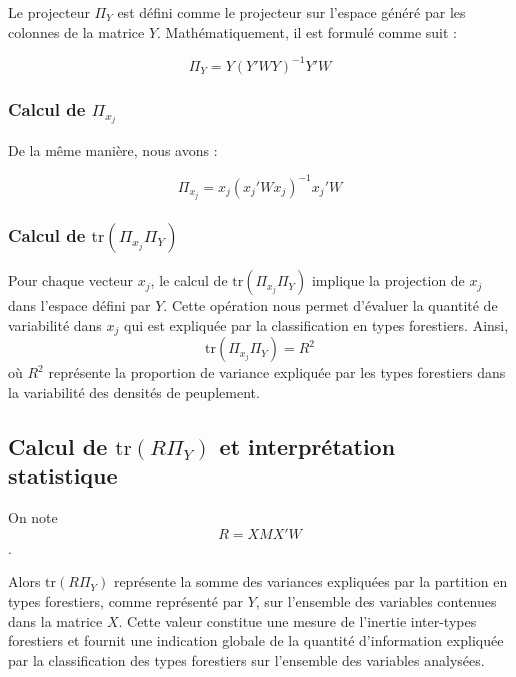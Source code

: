 \documentclass[
]{article}
\begin{document}
Le projecteur \(\Pi_Y\) est défini comme le projecteur sur l'espace
généré par les colonnes de la matrice \(Y\). Mathématiquement, il est
formulé comme suit :

\[
   \Pi_Y = Y \left( Y' W Y \right)^{-1} Y' W
   \]

\hypertarget{calcul-de-pi_x_j}{%
\subsubsection{\texorpdfstring{Calcul de
\(\Pi_{x_j}\)}{Calcul de \textbackslash Pi\_\{x\_j\}}}\label{calcul-de-pi_x_j}}

De la même manière, nous avons :

\[
   \Pi_{x_j} = {x_j} \left( {x_j}' W {x_j} \right)^{-1} {x_j}' W
   \]

\hypertarget{calcul-de-texttrpi_x_j-pi_y}{%
\subsubsection{\texorpdfstring{Calcul de
\(\text{tr}(\Pi_{x_j} \Pi_Y)\)}{Calcul de \textbackslash text\{tr\}(\textbackslash Pi\_\{x\_j\} \textbackslash Pi\_Y)}}\label{calcul-de-texttrpi_x_j-pi_y}}

Pour chaque vecteur \(x_j\), le calcul de \(\text{tr}(\Pi_{x_j} \Pi_Y)\)
implique la projection de \(x_j\) dans l'espace défini par \(Y\). Cette
opération nous permet d'évaluer la quantité de variabilité dans \(x_j\)
qui est expliquée par la classification en types forestiers.
Ainsi,\[ \text{tr}(\Pi_{x_j} \Pi_Y) = R^2 \] où \(R^2\) représente la
proportion de variance expliquée par les types forestiers dans la
variabilité des densités de peuplement.

\hypertarget{calcul-de-texttrr-pi_y-et-interpruxe9tation-statistique}{%
\subsection{\texorpdfstring{Calcul de \(\text{tr}(R \Pi_Y)\) et
interprétation
statistique}{Calcul de \textbackslash text\{tr\}(R \textbackslash Pi\_Y) et interprétation statistique}}\label{calcul-de-texttrr-pi_y-et-interpruxe9tation-statistique}}

On note \[ R = X M X' W \].

Alors \(\text{tr}(R \Pi_Y)\) représente la somme des variances
expliquées par la partition en types forestiers, comme représenté par
\(Y\), sur l'ensemble des variables contenues dans la matrice \(X\).
Cette valeur constitue une mesure de l'inertie inter-types forestiers et
fournit une indication globale de la quantité d'information expliquée
par la classification des types forestiers sur l'ensemble des variables
analysées.
\end{document}
